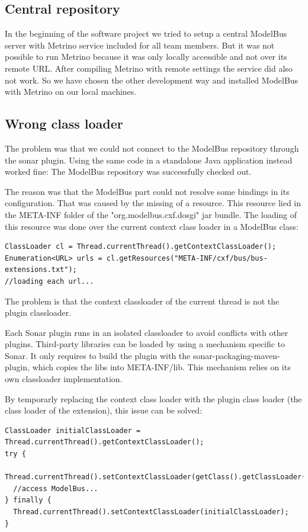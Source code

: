 
\subsection{Central repository}
In the beginning of the software project we tried to setup a central ModelBus server with Metrino service included for all team members. But it was not possible to run Metrino because it was only locally accessible and not over its remote URL. After compiling Metrino with remote settings the service did also not work. So we have chosen the other development way and installed ModelBus with Metrino on our local machines.
		
\subsection{Wrong class loader}
The problem was that we could not connect to the ModelBus repository through the sonar plugin. Using the same code in a standalone Java application instead worked fine: The ModelBus repository was successfully checked out.

The reason was that the ModelBus part could not resolve some bindings in its configuration. That was caused by the missing of a resource. This resource lied in the META-INF folder of the "org.modelbus.cxf.dosgi" jar bundle. The loading of this resource was done over the current context class loader in a ModelBus class:

\begin{verbatim}
ClassLoader cl = Thread.currentThread().getContextClassLoader();
Enumeration<URL> urls = cl.getResources("META-INF/cxf/bus/bus-extensions.txt");
//loading each url...
\end{verbatim}

The problem is that the context classloader of the current thread is not the plugin classloader.

Each Sonar plugin runs in an isolated classloader to avoid conflicts with other plugins. Third-party libraries can be loaded by using a mechanism specific to Sonar. It only requires to build the plugin with the sonar-packaging-maven-plugin, which copies the libs into META-INF/lib. This mechanism relies on its own classloader implementation.

By temporarly replacing the context class loader with the plugin class loader (the class loader of the extension), this issue can be solved:
\begin{verbatim}
ClassLoader initialClassLoader = Thread.currentThread().getContextClassLoader();
try {
  Thread.currentThread().setContextClassLoader(getClass().getClassLoader());
  //access ModelBus...
} finally {
  Thread.currentThread().setContextClassLoader(initialClassLoader);
}
\end{verbatim}

